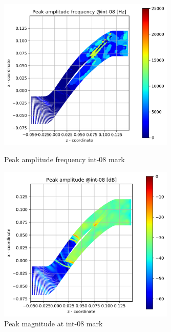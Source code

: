 \begin{figure}[ht]
  \centering
  \includegraphics[width=0.75\textwidth]{Figures/int-08-peak-freq.png}
  \caption{Peak amplitude frequency int-08 mark} \label{int-08-peak-freq}
  
  \vspace*{\floatsep}%

  \includegraphics[width=0.75\textwidth]{Figures/int-08-peak-mag.png}
  \caption{Peak magnitude at int-08 mark} \label{int-08-peak-mag}
\end{figure}

